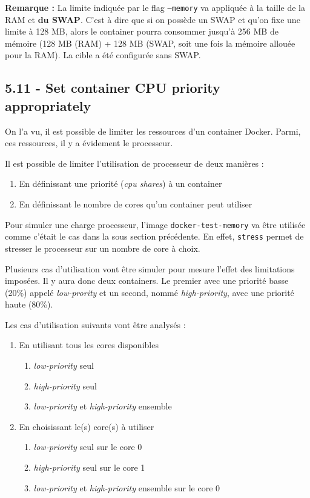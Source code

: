 \documentclass[11pt,a4paper,oneside]{report}
\newcommand{\code}[1]{\texttt{#1}}
\begin{document}
\textbf{Remarque :} La limite indiquée par le flag \code{--memory} va appliquée à la taille de la RAM et \textbf{du SWAP}\cite{marek_goldmann_res_mgmt}. C'est à dire que si on possède un SWAP et qu'on fixe une limite à 128 MB, alors le container pourra consommer jusqu'à 256 MB de mémoire (128 MB (RAM) + 128 MB (SWAP, soit une fois la mémoire allouée pour la RAM). La cible a été configurée sans SWAP.


\subsection{5.11 - Set container CPU priority appropriately}
On l'a vu, il est possible de limiter les ressources d'un container Docker. Parmi, ces ressources, il y a évidement le processeur.

Il est possible de limiter l'utilisation de processeur de deux manières :
\begin{enumerate}
\item En définissant une priorité (\textit{cpu shares}) à un container
\item En définissant le nombre de cores qu'un container peut utiliser
\end{enumerate}

Pour simuler une charge processeur, l'image \code{docker-test-memory} va être utilisée comme c'était le cas dans la sous section précédente. En effet, \code{stress} permet de stresser le processeur sur un nombre de core à choix.

Plusieurs cas d'utilisation vont être simuler pour mesure l'effet des limitations imposées. Il y aura donc deux containers. Le premier avec une priorité basse (20\%) appelé \textit{low-prority} et un second, nommé \textit{high-priority}, avec une priorité haute (80\%).

Les cas d'utilisation suivants vont être analysés :
\begin{enumerate}
	\item En utilisant tous les cores disponibles
	\begin{enumerate}
		\item \textit{low-priority} seul
		\item \textit{high-priority} seul
		\item \textit{low-priority} et \textit{high-priority} ensemble
	\end{enumerate}
	
    \item En choisissant le(s) core(s) à utiliser
	\begin{enumerate}
		\item \textit{low-priority} seul sur le core 0
		\item \textit{high-priority} seul sur le core 1
		\item \textit{low-priority} et \textit{high-priority} ensemble sur le core 0
    \end{enumerate}
\end{enumerate}
\end{document}
